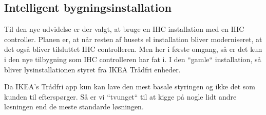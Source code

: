 \subsection{Intelligent bygningsinstallation}
Til den nye udvidelse er der valgt, at bruge en IHC installation med en IHC controller. Planen er, at når resten af husets el installation bliver moderniseret, at det også bliver tilsluttet IHC controlleren.
Men her i første omgang, så er det kun i den nye tilbygning som IHC controlleren har fat i. I den ``gamle`` installation, så bliver lysinstallationen styret fra IKEA Trådfri enheder.

Da IKEA's Trådfri app kun kan lave den mest basale styringen og ikke det som kunden til efterspørger. Så er vi ``tvunget`` til at kigge på nogle lidt andre løsningen end de meste standarde løsningen.
